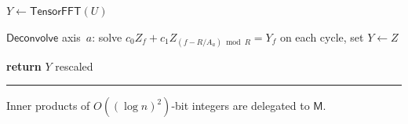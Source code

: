 {\begin{algorithm}[!ht]
\begin{algorithmic}[1]
\State $Y \gets \textsf{TensorFFT}(U)$ 

 

\State $\textsf{Deconvolve}$ axis~$a$: solve $c_0 Z_f + c_1 Z_{(f-R/A_a)\bmod R} = Y_f$ on each cycle, set $Y \gets Z$
\EndFor

\State \textbf{return} $Y$ rescaled 
\EndProcedure
\end{algorithmic}

\vspace{1.5pt}\hrule\vspace{2pt}
\noindent Inner products of $O((\log n)^2)$-bit integers are delegated to $\mathsf M$.
\end{algorithm}}

